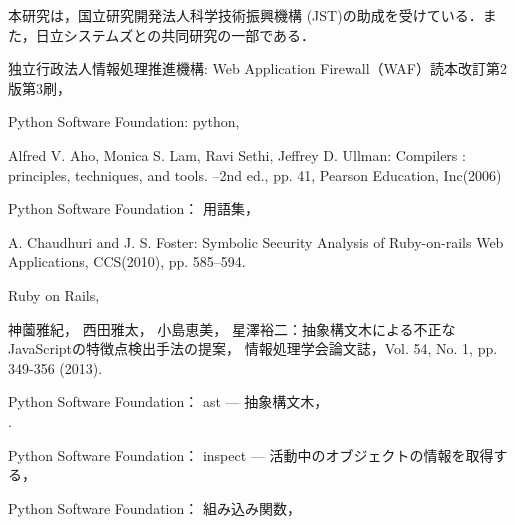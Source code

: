 \documentclass[submit]{ipsj}
\begin{document}
\begin{acknowledgment}
本研究は，国立研究開発法人科学技術振興機構 (JST)の助成を受けている．また，日立システムズとの共同研究の一部である．
\end{acknowledgment}

\begin{thebibliography}{10}
独立行政法人情報処理推進機構:
Web Application Firewall（WAF）読本改訂第2版第3刷，\\
%

Python Software Foundation:
python,\\
%

Alfred V. Aho, Monica S. Lam, Ravi Sethi, Jeffrey D. Ullman:
{Compilers : principles, techniques, and tools. --2nd ed.},
pp. 41,
Pearson Education, Inc(2006)


Python Software Foundation：
用語集，\\
%

A. Chaudhuri and J. S. Foster: {Symbolic Security Analysis of Ruby-on-rails Web Applications},
CCS(2010), pp. 585–594.

Ruby on Rails,\\
%

神薗雅紀， 西田雅太， 小島恵美， 星澤裕二：{抽象構文木による不正なJavaScriptの特徴点検出手法の提案}，
情報処理学会論文誌，Vol. 54, No. 1, pp. 349-356 (2013).

Python Software Foundation：
ast --- 抽象構文木，\\
%
.


Python Software Foundation：
inspect --- 活動中のオブジェクトの情報を取得する，\\
%

Python Software Foundation：
組み込み関数，
%

\end{thebibliography}
\end{document}
